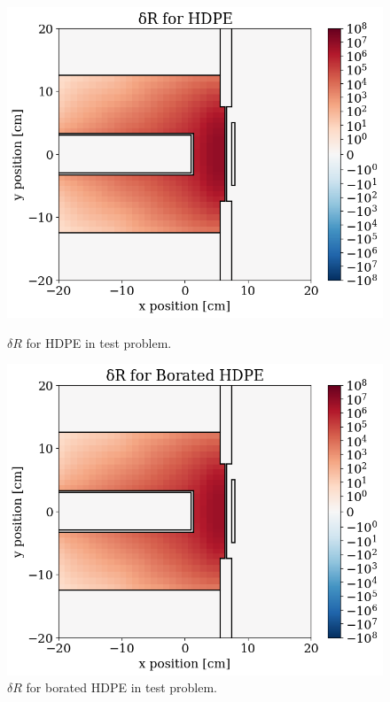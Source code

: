 \begin{figure}
\begin{minipage}{0.495\linewidth}
    \label{fig:tp:dR_13}
  \end{minipage}
  \begin{minipage}{0.495\linewidth}
    \centering
    \includegraphics[width=\linewidth]{content/testprob/dR_12.png}
    \caption{$\delta R$ for HDPE in test problem.}
    \label{fig:tp:dR_12}
  \end{minipage}
  \hfill
  \begin{minipage}{0.495\linewidth}
    \centering
    \includegraphics[width=\linewidth]{content/testprob/dR_11.png}
    \caption{$\delta R$ for borated HDPE in test problem.}
    \label{fig:tp:dR_11}
  \end{minipage}
\end{figure}


